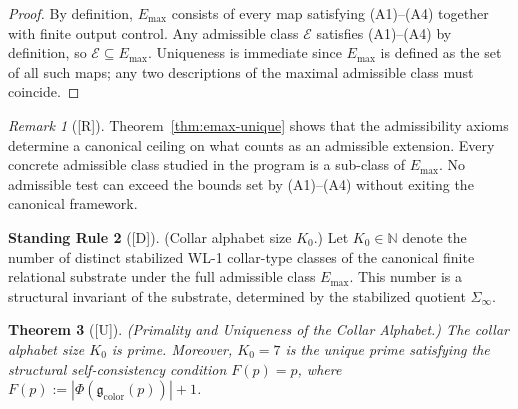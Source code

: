 \documentclass[12pt,oneside]{amsbook}
\theoremstyle{plain}
\newtheorem{theorem}{Theorem}[section]
\theoremstyle{definition}
\newtheorem{standingrule}[theorem]{Standing Rule}
\theoremstyle{remark}
\newtheorem{remark}[theorem]{Remark}
\newcommand{\status}[1]{\textup{[#1]}}
\begin{document}
\begin{proof}
By definition, $E_{\max}$ consists of every map satisfying (A1)--(A4)
together with finite output control.  Any admissible class
$\mathcal{E}$ satisfies (A1)--(A4) by definition, so $\mathcal{E}
\subseteq E_{\max}$.  Uniqueness is immediate since $E_{\max}$ is
defined as the set of all such maps; any two descriptions of the
maximal admissible class must coincide.
\end{proof}

\begin{remark}[\status{R}]
Theorem~\ref{thm:emax-unique} shows that the admissibility axioms
determine a canonical ceiling on what counts as an admissible
extension.  Every concrete admissible class studied in the program is
a sub-class of $E_{\max}$.  No admissible test can exceed the bounds
set by (A1)--(A4) without exiting the canonical framework.
\end{remark}


\begin{standingrule}[\status{D}]\label{sr:alphabet-prime}
\textup{(Collar alphabet size $K_0$.)}
Let $K_0 \in \mathbb{N}$ denote the number of distinct stabilized
WL-1 collar-type classes of the canonical finite relational
substrate under the full admissible class $E_{\max}$.  This number is
a structural invariant of the substrate, determined by the
stabilized quotient $\Sigma_\infty$.
\end{standingrule}

\begin{theorem}[\status{U}]\label{thm:K0-prime}
\textup{(Primality and Uniqueness of the Collar Alphabet.)}
The collar alphabet size $K_0$ is prime.  Moreover, $K_0 = 7$ is the
unique prime satisfying the structural self-consistency condition
$F(p) = p$, where $F(p) := |\Phi(\mathfrak{g}_{\mathrm{color}}(p))| + 1$.
\end{theorem}
\end{document}
